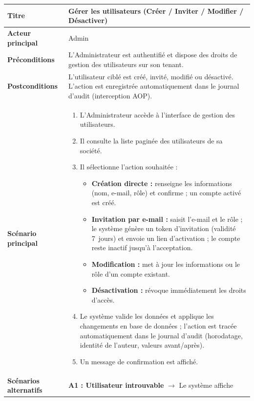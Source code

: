 \begin{xltabular}{\textwidth}{|l|X|}
    \textbf{Titre} & Gérer les utilisateurs (Créer / Inviter / Modifier / 
    Désactiver) \\ \hline
    \textbf{Acteur principal} & Admin \\ \hline
    \textbf{Préconditions} & L'Administrateur est authentifié et dispose des droits 
    de gestion des utilisateurs sur son tenant. \\ \hline
    \textbf{Postconditions} & L'utilisateur ciblé est créé, invité, modifié ou 
    désactivé. L'action est enregistrée automatiquement dans le journal d'audit 
    (interception AOP). \\ \hline
    \textbf{Scénario principal} &
    \begin{enumerate}[nosep, leftmargin=*]
        \item L'Administrateur accède à l'interface de gestion des utilisateurs.
        \item Il consulte la liste paginée des utilisateurs de sa société.
        \item Il sélectionne l'action souhaitée :
        \begin{itemize}[nosep, leftmargin=*]
            \item \textbf{Création directe :} renseigne les informations 
                  (nom, e-mail, rôle) et confirme ; un compte activé est créé.
            \item \textbf{Invitation par e-mail :} saisit l'e-mail et le rôle ; 
                  le système génère un token d'invitation (validité 7~jours) et 
                  envoie un lien d'activation ; le compte reste inactif jusqu'à 
                  l'acceptation.
            \item \textbf{Modification :} met à jour les informations ou le rôle 
                  d'un compte existant.
            \item \textbf{Désactivation :} révoque immédiatement les droits d'accès.
        \end{itemize}
        \item Le système valide les données et applique les changements en base 
              de données ; l'action est tracée automatiquement dans le journal 
              d'audit (horodatage, identité de l'auteur, valeurs avant/après).
        \item Un message de confirmation est affiché.
    \end{enumerate} \\ \hline
    \textbf{Scénarios alternatifs}
    & \textbf{A1 : Utilisateur introuvable} $\rightarrow$ Le système affiche 

\end{xltabular}
